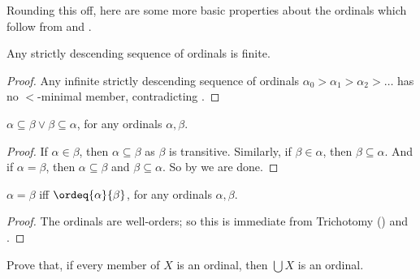 \documentclass[../../../include/open-logic-section]{subfiles}
\begin{document}
Rounding this off, here are some more basic properties about the
ordinals which follow from  and
. 

\begin{prop}
Any strictly descending sequence of ordinals is finite.
\end{prop}

\begin{proof}
Any infinite strictly descending sequence of ordinals $\alpha_0 > \alpha_1 > \alpha_2 > \ldots$ has no $<$-minimal
member, contradicting .
\end{proof}

\begin{prop}
$\alpha \subseteq \beta \lor \beta \subseteq \alpha$, for any ordinals
$\alpha, \beta$.
\end{prop}

\begin{proof}
If $\alpha \in \beta$, then $\alpha \subseteq \beta$ as $\beta$ is
transitive. Similarly, if $\beta \in \alpha$, then $\beta \subseteq
\alpha$. And if $\alpha = \beta$, then $\alpha \subseteq \beta$ and
$\beta \subseteq \alpha$. So by    we are done.
\end{proof}

\begin{prop}
$\alpha = \beta$ iff $\ordeq{\alpha}{\beta}$, for any ordinals
$\alpha, \beta$.
\end{prop}

\begin{proof}
The ordinals are well-orders; so this is immediate from Trichotomy
() and
. 
\end{proof}

\begin{prob}
Prove that, if every member of $X$ is an ordinal, then $\bigcup X$ is an ordinal.
\end{prob}
\end{document}
